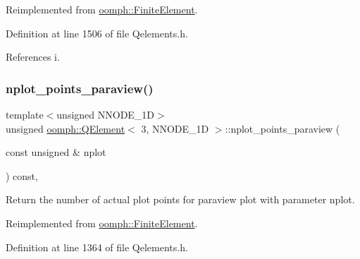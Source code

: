 Reimplemented from \hyperlink{classoomph_1_1FiniteElement_a8ed563c7ff0cfd8bafdbb0132b388106}{oomph\+::\+Finite\+Element}.



Definition at line 1506 of file Qelements.\+h.



References i.

\mbox{\label{classoomph_1_1QElement_3_013_00_01NNODE__1D_01_4_a53c3d7fccadcf9ccb31ffb189204b969}} 
\subsubsection{\texorpdfstring{nplot\+\_\+points\+\_\+paraview()}{nplot\_points\_paraview()}}
{\footnotesize\ttfamily template$<$unsigned N\+N\+O\+D\+E\+\_\+1D$>$ \\
unsigned \hyperlink{classoomph_1_1QElement}{oomph\+::\+Q\+Element}$<$ 3, N\+N\+O\+D\+E\+\_\+1D $>$\+::nplot\+\_\+points\+\_\+paraview (\begin{DoxyParamCaption}\item[{const unsigned \&}]{nplot }\end{DoxyParamCaption}) const\hspace{0.3cm}{\ttfamily [inline]}, {\ttfamily [virtual]}}



Return the number of actual plot points for paraview plot with parameter nplot. 



Reimplemented from \hyperlink{classoomph_1_1FiniteElement_a06d32c85753a1e302c3b345ea27f6c85}{oomph\+::\+Finite\+Element}.



Definition at line 1364 of file Qelements.\+h.

\mbox{\label{classoomph_1_1QElement_3_013_00_01NNODE__1D_01_4_ae10dea50eb35b969ebd996d21aa34c6b}} 
